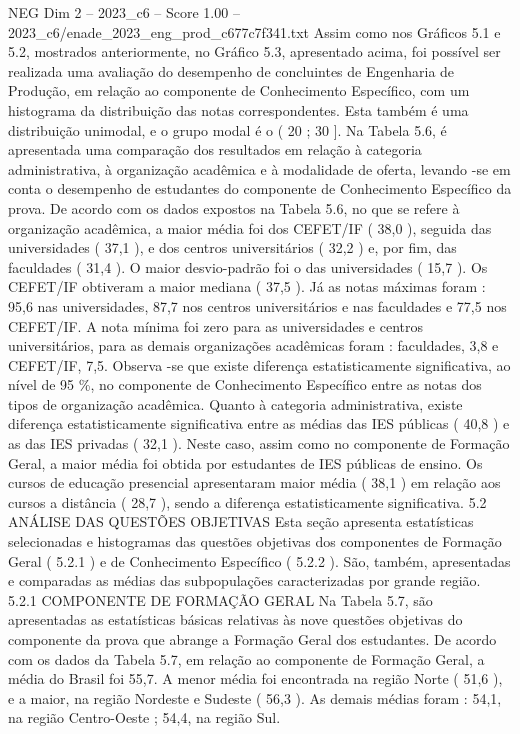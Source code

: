 \begin{textsample}{NEG Dim 2 – 2023\_c6 – Score 1.00 – 2023\_c6/enade\_2023\_eng\_prod\_c677c7f341.txt}
Assim como nos Gráficos 5.1 e 5.2, mostrados anteriormente, no Gráfico 5.3, apresentado acima, foi possível ser realizada uma avaliação do desempenho de concluintes de Engenharia de Produção, em relação ao componente de Conhecimento Específico, com um histograma da distribuição das notas correspondentes.
Esta também é uma distribuição unimodal, e o grupo modal é o ( 20 ; 30 ].
Na Tabela 5.6, é apresentada uma comparação dos resultados em relação à categoria administrativa, à organização acadêmica e à modalidade de oferta, levando -se em conta o desempenho de estudantes do componente de Conhecimento Específico da prova.
De acordo com os dados expostos na Tabela 5.6, no que se refere à organização acadêmica, a maior média foi dos CEFET/IF ( 38,0 ), seguida das universidades ( 37,1 ), e dos centros universitários ( 32,2 ) e, por fim, das faculdades ( 31,4 ).
O maior desvio-padrão foi o das universidades ( 15,7 ).
Os CEFET/IF obtiveram a maior mediana ( 37,5 ).
Já as notas máximas foram : 95,6 nas universidades, 87,7 nos centros universitários e nas faculdades e 77,5 nos CEFET/IF.
A nota mínima foi zero para as universidades e centros universitários, para as demais organizações acadêmicas foram : faculdades, 3,8 e CEFET/IF, 7,5.
Observa -se que existe diferença estatisticamente significativa, ao nível de 95 \%, no componente de Conhecimento Específico entre as notas dos tipos de organização acadêmica.
Quanto à categoria administrativa, existe diferença estatisticamente significativa entre as médias das IES públicas ( 40,8 ) e as das IES privadas ( 32,1 ).
Neste caso, assim como no componente de Formação Geral, a maior média foi obtida por estudantes de IES públicas de ensino.
Os cursos de educação presencial apresentaram maior média ( 38,1 ) em relação aos cursos a distância ( 28,7 ), sendo a diferença estatisticamente significativa. 5.2 ANÁLISE DAS QUESTÕES OBJETIVAS Esta seção apresenta estatísticas selecionadas e histogramas das questões objetivas dos componentes de Formação Geral ( 5.2.1 ) e de Conhecimento Específico ( 5.2.2 ).
São, também, apresentadas e comparadas as médias das subpopulações caracterizadas por grande região. 5.2.1 COMPONENTE DE FORMAÇÃO GERAL Na Tabela 5.7, são apresentadas as estatísticas básicas relativas às nove questões objetivas do componente da prova que abrange a Formação Geral dos estudantes.
De acordo com os dados da Tabela 5.7, em relação ao componente de Formação Geral, a média do Brasil foi 55,7.
A menor média foi encontrada na região Norte ( 51,6 ), e a maior, na região Nordeste e Sudeste ( 56,3 ).
As demais médias foram : 54,1, na região Centro-Oeste ; 54,4, na região Sul.

\end{textsample}
